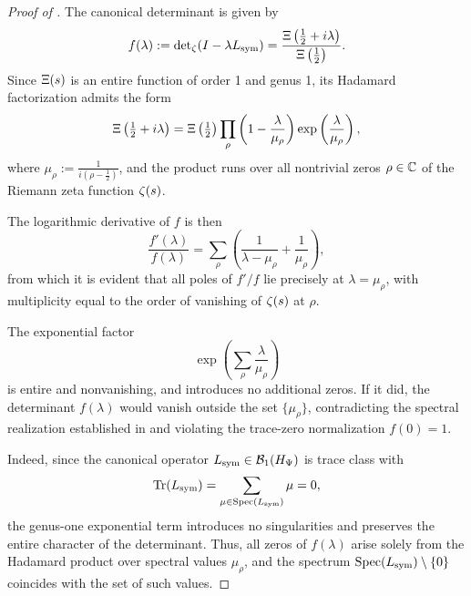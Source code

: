 \begin{proof}[Proof of ]
The canonical determinant is given by
\[
f(\lambda) := \det\nolimits_\zeta(I - \lambda L_{\mathrm{sym}}) = \frac{\Xi\left(\tfrac{1}{2} + i\lambda\right)}{\Xi\left(\tfrac{1}{2}\right)}.
\]
Since \( \Xi(s) \) is an entire function of order 1 and genus 1, its Hadamard factorization admits the form
\[
\Xi\left(\tfrac{1}{2} + i\lambda\right)
= \Xi\left(\tfrac{1}{2}\right) \prod_{\rho} \left(1 - \frac{\lambda}{\mu_\rho} \right)
\exp\left( \frac{\lambda}{\mu_\rho} \right),
\]
where \( \mu_\rho := \frac{1}{i(\rho - \tfrac{1}{2})} \), and the product runs over all nontrivial zeros \( \rho \in \mathbb{C} \) of the Riemann zeta function \( \zeta(s) \).

\medskip
\noindent
The logarithmic derivative of \( f \) is then
\[
\frac{f'(\lambda)}{f(\lambda)} = \sum_\rho \left( \frac{1}{\lambda - \mu_\rho} + \frac{1}{\mu_\rho} \right),
\]
from which it is evident that all poles of \( f'/f \) lie precisely at \( \lambda = \mu_\rho \), with multiplicity equal to the order of vanishing of \( \zeta(s) \) at \( \rho \).

\medskip
\noindent
The exponential factor
\[
\exp\left( \sum_\rho \frac{\lambda}{\mu_\rho} \right)
\]
is entire and nonvanishing, and introduces no additional zeros. If it did, the determinant \( f(\lambda) \) would vanish outside the set \( \{ \mu_\rho \} \), contradicting the spectral realization established in  and violating the trace-zero normalization \( f(0) = 1 \).

\medskip
\noindent
Indeed, since the canonical operator \( L_{\mathrm{sym}} \in \mathcal{B}_1(H_{\Psi}) \) is trace class with
\[
\operatorname{Tr}(L_{\mathrm{sym}}) = \sum_{\mu \in \operatorname{Spec}(L_{\mathrm{sym}})} \mu = 0,
\]
the genus-one exponential term introduces no singularities and preserves the entire character of the determinant. Thus, all zeros of \( f(\lambda) \) arise solely from the Hadamard product over spectral values \( \mu_\rho \), and the spectrum \( \operatorname{Spec}(L_{\mathrm{sym}}) \setminus \{0\} \) coincides with the set of such values.
\end{proof}

